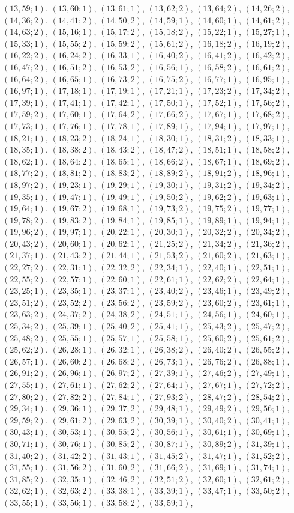 \documentclass[11pt]{article}
\begin{document}
$(13,59;1)$, $(13,60;1)$, $(13,61;1)$, $(13,62;2)$, $(13,64;2)$, $(14,26;2)$, $(14,36;2)$, $(14,41;2)$, $(14,50;2)$, $(14,59;1)$, $(14,60;1)$, $(14,61;2)$, $(14,63;2)$, $(15,16;1)$, $(15,17;2)$, $(15,18;2)$, $(15,22;1)$, $(15,27;1)$, $(15,33;1)$, $(15,55;2)$, $(15,59;2)$, $(15,61;2)$, $(16,18;2)$, $(16,19;2)$, $(16,22;2)$, $(16,24;2)$, $(16,33;1)$, $(16,40;2)$, $(16,41;2)$, $(16,42;2)$, $(16,47;2)$, $(16,51;2)$, $(16,53;2)$, $(16,56;1)$, $(16,58;2)$, $(16,61;2)$, $(16,64;2)$, $(16,65;1)$, $(16,73;2)$, $(16,75;2)$, $(16,77;1)$, $(16,95;1)$, $(16,97;1)$, $(17,18;1)$, $(17,19;1)$, $(17,21;1)$, $(17,23;2)$, $(17,34;2)$, $(17,39;1)$, $(17,41;1)$, $(17,42;1)$, $(17,50;1)$, $(17,52;1)$, $(17,56;2)$, $(17,59;2)$, $(17,60;1)$, $(17,64;2)$, $(17,66;2)$, $(17,67;1)$, $(17,68;2)$, $(17,73;1)$, $(17,76;1)$, $(17,78;1)$, $(17,89;1)$, $(17,94;1)$, $(17,97;1)$, $(18,21;1)$, $(18,23;2)$, $(18,24;1)$, $(18,30;1)$, $(18,31;2)$, $(18,33;1)$, $(18,35;1)$, $(18,38;2)$, $(18,43;2)$, $(18,47;2)$, $(18,51;1)$, $(18,58;2)$, $(18,62;1)$, $(18,64;2)$, $(18,65;1)$, $(18,66;2)$, $(18,67;1)$, $(18,69;2)$, $(18,77;2)$, $(18,81;2)$, $(18,83;2)$, $(18,89;2)$, $(18,91;2)$, $(18,96;1)$, $(18,97;2)$, $(19,23;1)$, $(19,29;1)$, $(19,30;1)$, $(19,31;2)$, $(19,34;2)$, $(19,35;1)$, $(19,47;1)$, $(19,49;1)$, $(19,50;2)$, $(19,62;2)$, $(19,63;1)$, $(19,64;1)$, $(19,67;2)$, $(19,68;1)$, $(19,73;2)$, $(19,75;2)$, $(19,77;1)$, $(19,78;2)$, $(19,83;2)$, $(19,84;1)$, $(19,85;1)$, $(19,89;1)$, $(19,94;1)$, $(19,96;2)$, $(19,97;1)$, $(20,22;1)$, $(20,30;1)$, $(20,32;2)$, $(20,34;2)$, $(20,43;2)$, $(20,60;1)$, $(20,62;1)$, $(21,25;2)$, $(21,34;2)$, $(21,36;2)$, $(21,37;1)$, $(21,43;2)$, $(21,44;1)$, $(21,53;2)$, $(21,60;2)$, $(21,63;1)$, $(22,27;2)$, $(22,31;1)$, $(22,32;2)$, $(22,34;1)$, $(22,40;1)$, $(22,51;1)$, $(22,55;2)$, $(22,57;1)$, $(22,60;1)$, $(22,61;1)$, $(22,62;2)$, $(22,64;1)$, $(23,25;1)$, $(23,35;1)$, $(23,37;1)$, $(23,40;2)$, $(23,46;1)$, $(23,49;2)$, $(23,51;2)$, $(23,52;2)$, $(23,56;2)$, $(23,59;2)$, $(23,60;2)$, $(23,61;1)$, $(23,63;2)$, $(24,37;2)$, $(24,38;2)$, $(24,51;1)$, $(24,56;1)$, $(24,60;1)$, $(25,34;2)$, $(25,39;1)$, $(25,40;2)$, $(25,41;1)$, $(25,43;2)$, $(25,47;2)$, $(25,48;2)$, $(25,55;1)$, $(25,57;1)$, $(25,58;1)$, $(25,60;2)$, $(25,61;2)$, $(25,62;2)$, $(26,28;1)$, $(26,32;1)$, $(26,38;2)$, $(26,40;2)$, $(26,55;2)$, $(26,57;1)$, $(26,60;2)$, $(26,68;2)$, $(26,73;1)$, $(26,76;2)$, $(26,88;1)$, $(26,91;2)$, $(26,96;1)$, $(26,97;2)$, $(27,39;1)$, $(27,46;2)$, $(27,49;1)$, $(27,55;1)$, $(27,61;1)$, $(27,62;2)$, $(27,64;1)$, $(27,67;1)$, $(27,72;2)$, $(27,80;2)$, $(27,82;2)$, $(27,84;1)$, $(27,93;2)$, $(28,47;2)$, $(28,54;2)$, $(29,34;1)$, $(29,36;1)$, $(29,37;2)$, $(29,48;1)$, $(29,49;2)$, $(29,56;1)$, $(29,59;2)$, $(29,61;2)$, $(29,63;2)$, $(30,39;1)$, $(30,40;2)$, $(30,41;1)$, $(30,43;1)$, $(30,53;1)$, $(30,55;2)$, $(30,56;1)$, $(30,61;1)$, $(30,69;1)$, $(30,71;1)$, $(30,76;1)$, $(30,85;2)$, $(30,87;1)$, $(30,89;2)$, $(31,39;1)$, $(31,40;2)$, $(31,42;2)$, $(31,43;1)$, $(31,45;2)$, $(31,47;1)$, $(31,52;2)$, $(31,55;1)$, $(31,56;2)$, $(31,60;2)$, $(31,66;2)$, $(31,69;1)$, $(31,74;1)$, $(31,85;2)$, $(32,35;1)$, $(32,46;2)$, $(32,51;2)$, $(32,60;1)$, $(32,61;2)$, $(32,62;1)$, $(32,63;2)$, $(33,38;1)$, $(33,39;1)$, $(33,47;1)$, $(33,50;2)$, $(33,55;1)$, $(33,56;1)$, $(33,58;2)$, $(33,59;1)$, 
\end{document}

